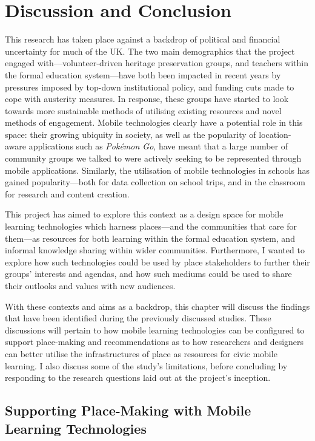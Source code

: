 \chapter{Discussion and Conclusion}
\label{chap:discussionConclusion}

This research has taken place against a backdrop of political and financial uncertainty for much of the UK. The two main demographics that the project engaged with---volunteer-driven heritage preservation groups, and teachers within the formal education system---have both been impacted in recent years by pressures imposed by top-down institutional policy, and funding cuts made to cope with austerity measures. In response, these groups have started to look towards more sustainable methods of utilising existing resources and novel methods of engagement. Mobile technologies clearly have a potential role in this space: their growing ubiquity in society, as well as the popularity of location-aware applications such as \textit{Pok\'emon Go}, have meant that a large number of community groups we talked to were actively seeking to be represented through mobile applications. Similarly, the utilisation of mobile technologies in schools has gained popularity---both for data collection on school trips, and in the classroom for research and content creation.

This project has aimed to explore this context as a design space for mobile learning technologies which harness places---and the communities that care for them---as resources for both learning within the formal education system, and informal knowledge sharing within wider communities. Furthermore, I wanted to explore how such technologies could be used by place stakeholders to further their groups' interests and agendas, and how such mediums could be used to share their outlooks and values with new audiences.

With these contexts and aims as a backdrop, this chapter will discuss the findings that have been identified during the previously discussed studies. These discussions will pertain to how mobile learning technologies can be configured to support place-making and recommendations as to how researchers and designers can better utilise the infrastructures of place as resources for civic mobile learning. I also discuss some of the study's limitations, before concluding by responding to the research questions laid out at the project's inception.


\section{Supporting Place-Making with Mobile Learning Technologies}

